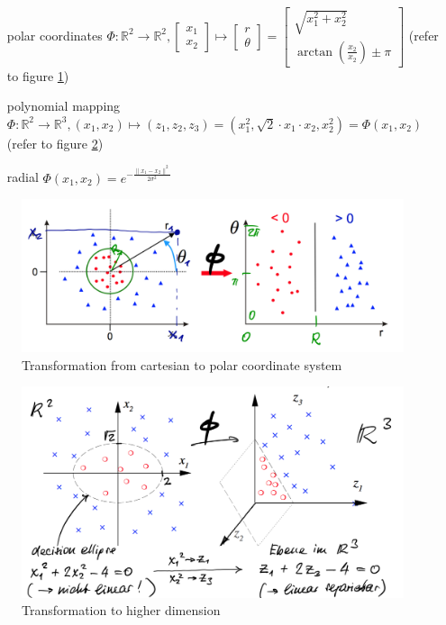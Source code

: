 \documentclass[a4paper, 11pt]{article}
\begin{document}
\begin{itemize}[leftmargin=*, labelindent=3.5cm, labelsep=0.5cm]
	\item[polar coordinates] $\Phi: \mathbb{R}^2 \rightarrow \mathbb{R}^2, \begin{bmatrix}x_1\\x_2\end{bmatrix}\mapsto\begin{bmatrix}r\\\theta\end{bmatrix}=\begin{bmatrix}\sqrt{x_1^2 + x_2^2}\\\arctan(\frac{x_2}{x_2})\pm\pi\end{bmatrix}$ (refer to figure \ref{fig:kernelfunctionspolarcoordinates})
	\item[polynomial mapping] $\Phi: \mathbb{R}^2 \rightarrow \mathbb{R}^3, (x_1,x_2) \mapsto (z_1,z_2,z_3) = (x_1^2,\sqrt{2}\cdot x_1\cdot x_2, x_2^2) = \Phi(x_1,x_2)$ (refer to figure \ref{fig:kernelfunctionspolynomialmapping})
	\item[radial] $\Phi(x_1,x_2) = e^{-\frac{\| x_1 - x_2 \|^2}{2\sigma^2}}$
\end{itemize}

\begin{figure}[htb!]
	\centering
	\includegraphics[keepaspectratio,width=0.7\linewidth]{Pictures/kernel_functions_polar_coordinates}
	\caption{Transformation from cartesian to polar coordinate system}
	\label{fig:kernelfunctionspolarcoordinates}
\end{figure}

\begin{figure}[htb!]
	\centering
	\includegraphics[keepaspectratio,width=0.7\linewidth]{Pictures/kernel_functions_polynomial_mapping}
	\caption{Transformation to higher dimension}
	\label{fig:kernelfunctionspolynomialmapping}
\end{figure}
\end{document}
